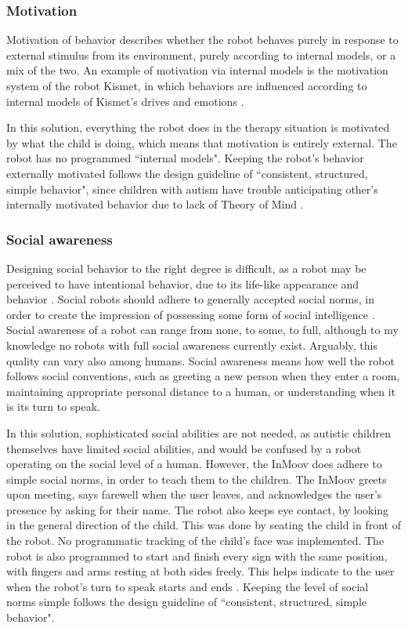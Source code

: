 \subsubsection{Motivation}

Motivation of behavior describes whether the robot behaves purely in response to external stimulus from its environment, purely according to internal models, or a mix of the two. An example of motivation via internal models is the motivation system of the robot Kismet, in which behaviors are influenced according to internal models of Kismet's drives and emotions \cite{breazeal2004}.

In this solution, everything the robot does in the therapy situation is motivated by what the child is doing, which means that motivation is entirely external. The robot has no programmed ``internal models". Keeping the robot's behavior externally motivated follows the design guideline of ``consistent, structured, simple behavior", since children with autism have trouble anticipating other's internally motivated behavior due to lack of Theory of Mind \cite{baron1985does, frith2003autism}.



\subsubsection{Social awareness}

Designing social behavior to the right degree is difficult, as a robot may be perceived to have intentional behavior, due to its life-like appearance and behavior \cite{bartneck2004design}. Social robots should adhere to generally accepted social norms, in order to create the impression of possessing some form of social intelligence \cite{bartneck2004design, designSpaces}. Social awareness of a robot can range from none, to some, to full, although to my knowledge no robots with full social awareness currently exist. Arguably, this quality can vary also among humans. Social awareness means how well the robot follows social conventions, such as greeting a new person when they enter a room, maintaining appropriate personal distance to a human, or understanding when it is its turn to speak.

In this solution, sophisticated social abilities are not needed, as autistic children themselves have limited social abilities, and would be confused by a robot operating on the social level of a human. However, the InMoov does adhere to simple social norms, in order to teach them to the children. The InMoov greets upon meeting, says farewell when the user leaves, and acknowledges the user's presence by asking for their name. The robot also keeps eye contact, by looking in the general direction of the child. This was done by seating the child in front of the robot. No programmatic tracking of the child's face was implemented. The robot is also programmed to start and finish every sign with the same position, with fingers and arms resting at both sides freely. This helps indicate to the user when the robot's turn to speak starts and ends \cite{uluer2015new}. Keeping the level of social norms simple follows the design guideline of ``consistent, structured, simple behavior".


